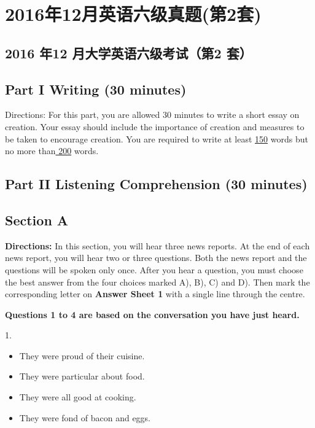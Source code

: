 \documentclass[UTF8,11pt]{ctexart}
\begin{document}
\section*{2016年12月英语六级真题(第2套)}
\subsection*{\textbf{2016 年12 月大学英语六级考试（第2 套）}}


\subsection*{Part I Writing (30 minutes)}


Directions: For this part, you are allowed 30 minutes to write a short essay on creation. Your essay should include the importance of creation and measures to be taken to encourage creation. You are required to write at least \uline{150} words but no more than\uline{ 200} words.


\subsection*{\textbf{Part II} \textbf{Listening Comprehension} \textbf{(30 minutes)}}


\subsection*{\textbf{Section A}}


\textbf{Directions:} In this section, you will hear three news reports. At the end of each news report, you will hear two or three questions. Both the news report and the questions will be spoken only once. After you hear a question, you must choose the best answer from the four choices marked A), B), C) and D). Then mark the corresponding letter on \textbf{Answer Sheet 1} with a single line through the centre.


\textbf{Questions 1 to 4 are based on the conversation you have just heard.}


1.


\begin{itemize}[leftmargin=2em,itemsep=.2em,topsep=.4em]\item[A.] They were proud of their cuisine.
\item[B.] They were particular about food.
\item[C.] They were all good at cooking.
\item[D.] They were fond of bacon and eggs.
\end{itemize}
\end{document}
